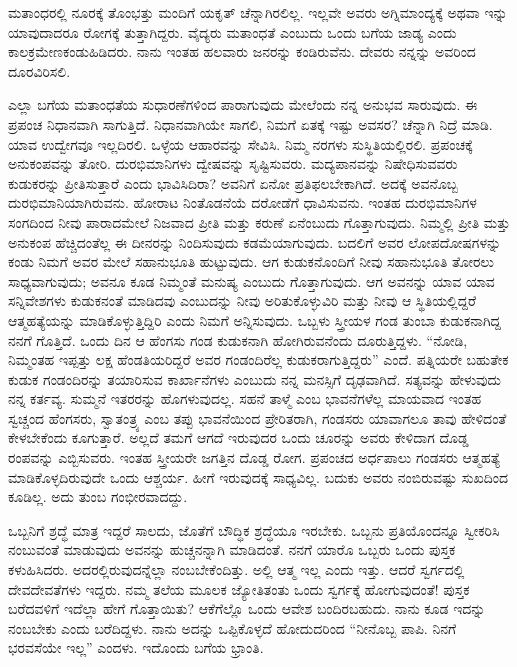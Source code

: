 ಮತಾಂಧರಲ್ಲಿ ನೂರಕ್ಕೆ ತೊಂಭತ್ತು ಮಂದಿಗೆ ಯಕೃತ್​ ಚೆನ್ನಾಗಿರಲಿಲ್ಲ. ಇಲ್ಲವೇ ಅವರು ಅಗ್ನಿಮಾಂದ್ಯಕ್ಕೆ ಅಥವಾ ಇನ್ನು ಯಾವುದಾದರೂ ರೋಗಕ್ಕೆ ತುತ್ತಾಗಿದ್ದರು. ವೈದ್ಯರು ಮತಾಂಧತೆ ಎಂಬುದು ಒಂದು ಬಗೆಯ ಜಾಡ್ಯ ಎಂದು ಕಾಲಕ್ರಮೇಣ\break ಕಂಡುಹಿಡಿದರು. ನಾನು ಇಂತಹ ಹಲವಾರು ಜನರನ್ನು ಕಂಡಿರುವೆನು. ದೇವರು ನನ್ನನ್ನು ಅವರಿಂದ ದೂರವಿರಿಸಲಿ.

ಎಲ್ಲಾ ಬಗೆಯ ಮತಾಂಧತೆಯ ಸುಧಾರಣೆಗಳಿಂದ ಪಾರಾಗುವುದು ಮೇಲೆಂದು ನನ್ನ ಅನುಭವ ಸಾರುವುದು. ಈ ಪ್ರಪಂಚ ನಿಧಾನವಾಗಿ ಸಾಗುತ್ತಿದೆ. ನಿಧಾನವಾಗಿಯೇ ಸಾಗಲಿ, ನಿಮಗೆ ಏತಕ್ಕೆ ಇಷ್ಟು ಅವಸರ? ಚೆನ್ನಾಗಿ ನಿದ್ರೆ ಮಾಡಿ. ಯಾವ ಉದ್ವೇಗವೂ ಇಲ್ಲದಿರಲಿ. ಒಳ್ಳೆಯ ಆಹಾರವನ್ನು ಸೇವಿಸಿ. ನಿಮ್ಮ ನರಗಳು ಸುಸ್ಥಿತಿಯಲ್ಲಿರಲಿ. ಪ್ರಪಂಚಕ್ಕೆ ಅನುಕಂಪವನ್ನು ತೋರಿ. ದುರಭಿಮಾನಿಗಳು ದ್ವೇಷವನ್ನು ಸೃಷ್ಟಿಸುವರು. ಮದ್ಯಪಾನವನ್ನು ನಿಷೇಧಿಸುವವರು ಕುಡುಕರನ್ನು ಪ್ರೀತಿಸುತ್ತಾರೆ ಎಂದು ಭಾವಿಸಿದಿರಾ? ಅವನಿಗೆ ಏನೋ ಪ್ರತಿಫಲಬೇಕಾಗಿದೆ. ಅದಕ್ಕೆ ಅವನೊಬ್ಬ ದುರಭಿಮಾನಿಯಾಗಿರುವನು. ಹೋರಾಟ ನಿಂತೊಡನೆಯೆ ದರೋಡೆಗೆ ಧಾವಿಸುವನು. ಇಂತಹ ದುರಭಿಮಾನಿಗಳ ಸಂಗದಿಂದ ನೀವು ಪಾರಾದಮೇಲೆ ನಿಜವಾದ ಪ್ರೀತಿ ಮತ್ತು ಕರುಣೆ ಏನೆಂಬುದು ಗೊತ್ತಾಗುವುದು. ನಿಮ್ಮಲ್ಲಿ ಪ್ರೀತಿ ಮತ್ತು ಅನುಕಂಪ ಹೆಚ್ಚಿದಂತೆಲ್ಲ ಈ ದೀನರನ್ನು ನಿಂದಿಸುವುದು ಕಡಮೆಯಾಗುವುದು. ಬದಲಿಗೆ ಅವರ ಲೋಪದೋಷಗಳನ್ನು ಕಂಡು ನಿಮಗೆ ಅವರ ಮೇಲೆ ಸಹಾನುಭೂತಿ ಹುಟ್ಟುವುದು. ಆಗ ಕುಡುಕನೊಂದಿಗೆ ನೀವು ಸಹಾನುಭೂತಿ ತೋರಲು ಸಾಧ್ಯವಾಗುವುದು; ಅವನೂ ಕೂಡ ನಿಮ್ಮಂತೆ ಮನುಷ್ಯ ಎಂಬುದು ಗೊತ್ತಾಗುವುದು. ಆಗ ಅವನನ್ನು ಯಾವ ಯಾವ ಸನ್ನಿವೇಶಗಳು ಕುಡುಕನಂತೆ ಮಾಡಿದವು ಎಂಬುದನ್ನು ನೀವು ಅರಿತುಕೊಳ್ಳುವಿರಿ ಮತ್ತು ನೀವು ಆ ಸ್ಥಿತಿಯಲ್ಲಿದ್ದರೆ ಆತ್ಮಹತ್ಯೆಯನ್ನು ಮಾಡಿಕೊಳ್ಳುತ್ತಿದ್ದಿರಿ ಎಂದು ನಿಮಗೆ ಅನ್ನಿಸುವುದು. ಒಬ್ಬಳು ಸ್ತ್ರೀಯಳ ಗಂಡ ತುಂಬಾ ಕುಡುಕನಾಗಿದ್ದ ನನಗೆ ಗೊತ್ತಿದೆ. ಒಂದು ದಿನ ಆ ಹೆಂಗಸು ಗಂಡ ಕುಡುಕನಾಗಿ ಹೋಗಿರುವನೆಂದು ದೂರುತ್ತಿದ್ದಳು. “ನೋಡಿ, ನಿಮ್ಮಂತಹ ಇಪ್ಪತ್ತು ಲಕ್ಷ ಹೆಂಡತಿಯರಿದ್ದರೆ ಅವರ ಗಂಡಂದಿರೆಲ್ಲ ಕುಡುಕರಾಗುತ್ತಿದ್ದರು” ಎಂದೆ. ಪತ್ನಿಯರೇ ಬಹುತೇಕ ಕುಡುಕ ಗಂಡಂದಿರನ್ನು ತಯಾರಿಸುವ ಕಾರ್ಖಾನೆಗಳು ಎಂಬುದು ನನ್ನ ಮನಸ್ಸಿಗೆ ದೃಢವಾಗಿದೆ. ಸತ್ಯವನ್ನು ಹೇಳುವುದು ನನ್ನ ಕರ್ತವ್ಯ. ಸುಮ್ಮನೆ ಇತರರನ್ನು ಹೊಗಳುವುದಲ್ಲ. ಸಹನೆ ತಾಳ್ಮೆ ಎಂಬ ಭಾವನೆಗಳೆಲ್ಲ ಮಾಯವಾದ ಇಂತಹ ಸ್ವಚ್ಚಂದ ಹೆಂಗಸರು, ಸ್ವಾತಂತ್ರ್ಯ ಎಂಬ ತಪ್ಪು ಭಾವನೆಯಿಂದ ಪ್ರೇರಿತರಾಗಿ, ಗಂಡಸರು ಯಾವಾಗಲೂ ತಾವು ಹೇಳಿದಂತೆ ಕೇಳಬೇಕೆಂದು ಕೂಗುತ್ತಾರೆ. ಅಲ್ಲದೆ ತಮಗೆ ಆಗದೆ ಇರುವುದರ ಒಂದು ಚೂರನ್ನು ಅವರು ಕೇಳಿದಾಗ ದೊಡ್ಡ ರಂಪವನ್ನು ಎಬ್ಬಿಸುವರು. ಇಂತಹ ಸ್ತ್ರೀಯರೇ ಜಗತ್ತಿನ ದೊಡ್ಡ ರೋಗ. ಪ್ರಪಂಚದ ಅರ್ಧಪಾಲು ಗಂಡಸರು ಆತ್ಮಹತ್ಯೆ ಮಾಡಿಕೊಳ್ಳದಿರುವುದೇ ಒಂದು ಆಶ್ಚರ್ಯ. ಹೀಗೆ ಇರುವುದಕ್ಕೆ ಸಾಧ್ಯವಿಲ್ಲ. ಬದುಕು ಅವರು ನಂಬಿರುವಷ್ಟು ಸುಖದಿಂದ ಕೂಡಿಲ್ಲ. ಅದು ತುಂಬ ಗಂಭೀರವಾದದ್ದು.

ಒಬ್ಬನಿಗೆ ಶ್ರದ್ಧೆ ಮಾತ್ರ ಇದ್ದರೆ ಸಾಲದು, ಜೊತೆಗೆ ಬೌದ್ಧಿಕ ಶ್ರದ್ಧೆಯೂ ಇರಬೇಕು. ಒಬ್ಬನು ಪ್ರತಿಯೊಂದನ್ನೂ ಸ್ವೀಕರಿಸಿ ನಂಬುವಂತೆ ಮಾಡುವುದು ಅವನನ್ನು ಹುಚ್ಚನನ್ನಾಗಿ ಮಾಡಿದಂತೆ. ನನಗೆ ಯಾರೊ ಒಬ್ಬರು ಒಂದು ಪುಸ್ತಕ ಕಳುಹಿಸಿದರು. ಅದರಲ್ಲಿರುವುದ\-ನ್ನೆಲ್ಲಾ ನಂಬಬೇಕೆಂದಿತ್ತು. ಅಲ್ಲಿ ಆತ್ಮ ಇಲ್ಲ ಎಂದು ಇತ್ತು. ಆದರೆ ಸ್ವರ್ಗದಲ್ಲಿ ದೇವದೇವತೆಗಳು ಇದ್ದರು. ನಮ್ಮ ತಲೆಯ ಮೂಲಕ ಜ್ಯೋತಿತಂತು ಒಂದು ಸ್ವರ್ಗಕ್ಕೆ ಹೋಗುವುದಂತೆ! ಪುಸ್ತಕ ಬರೆದವಳಿಗೆ ಇದೆಲ್ಲಾ ಹೇಗೆ ಗೊತ್ತಾಯಿತು? ಆಕೆಗೆಲ್ಲೊ ಒಂದು ಆವೇಶ ಬಂದಿರಬಹುದು. ನಾನು ಕೂಡ ಇದನ್ನು ನಂಬಬೇಕು ಎಂದು ಬರೆದಿದ್ದಳು. ನಾನು ಅದನ್ನು ಒಪ್ಪಿಕೊಳ್ಳದೆ ಹೋದುದರಿಂದ “ನೀನೊಬ್ಬ ಪಾಪಿ. ನಿನಗೆ ಭರವಸೆಯೇ ಇಲ್ಲ” ಎಂದಳು. ಇದೊಂದು ಬಗೆಯ ಭ್ರಾಂತಿ.

